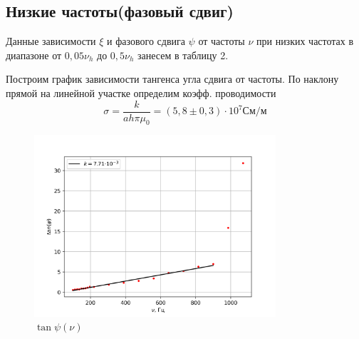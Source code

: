 \documentclass[a4paper, 12pt]{article}
\begin{document}
\subsection*{Низкие частоты(фазовый сдвиг)}
Данные зависимости $\xi$ и фазового сдвига $\psi$ от частоты $\nu$ при низких частотах в диапазоне от $0,05\nu_h \text{ до }  0,5\nu_h$ занесем в таблицу 2.


	Построим график зависимости тангенса угла сдвига от частоты. По наклону прямой на линейной участке определим коэфф. проводимости
\begin{equation}
	\sigma = \frac{k}{ah\pi\mu_0} = (5,8 \pm 0,3)\cdot 10^7 \text{См/м}
\end{equation}
\begin{figure}[H]
    \centering
    \includegraphics[width=0.8\textwidth]{tanpsinu}
    \caption{$\tan \psi(\nu)$}
    \label{fig:tanpsinu}
\end{figure}
\end{document}

